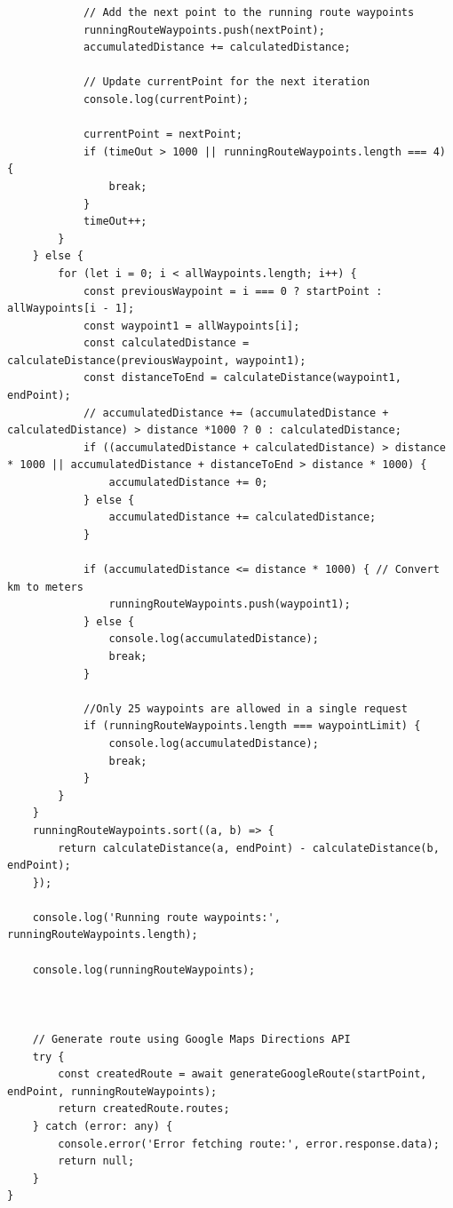 \begin{lstlisting}
            // Add the next point to the running route waypoints
            runningRouteWaypoints.push(nextPoint);
            accumulatedDistance += calculatedDistance;

            // Update currentPoint for the next iteration
            console.log(currentPoint);

            currentPoint = nextPoint;
            if (timeOut > 1000 || runningRouteWaypoints.length === 4) {
                break;
            }
            timeOut++;
        }
    } else {
        for (let i = 0; i < allWaypoints.length; i++) {
            const previousWaypoint = i === 0 ? startPoint : allWaypoints[i - 1];
            const waypoint1 = allWaypoints[i];
            const calculatedDistance = calculateDistance(previousWaypoint, waypoint1);
            const distanceToEnd = calculateDistance(waypoint1, endPoint);
            // accumulatedDistance += (accumulatedDistance + calculatedDistance) > distance *1000 ? 0 : calculatedDistance;
            if ((accumulatedDistance + calculatedDistance) > distance * 1000 || accumulatedDistance + distanceToEnd > distance * 1000) {
                accumulatedDistance += 0;
            } else {
                accumulatedDistance += calculatedDistance;
            }

            if (accumulatedDistance <= distance * 1000) { // Convert km to meters
                runningRouteWaypoints.push(waypoint1);
            } else {
                console.log(accumulatedDistance);
                break;
            }

            //Only 25 waypoints are allowed in a single request
            if (runningRouteWaypoints.length === waypointLimit) {
                console.log(accumulatedDistance);
                break;
            }
        }
    }
    runningRouteWaypoints.sort((a, b) => {
        return calculateDistance(a, endPoint) - calculateDistance(b, endPoint);
    });

    console.log('Running route waypoints:', runningRouteWaypoints.length);

    console.log(runningRouteWaypoints);



    // Generate route using Google Maps Directions API
    try {
        const createdRoute = await generateGoogleRoute(startPoint, endPoint, runningRouteWaypoints);
        return createdRoute.routes;
    } catch (error: any) {
        console.error('Error fetching route:', error.response.data);
        return null;
    }
}
\end{lstlisting}

